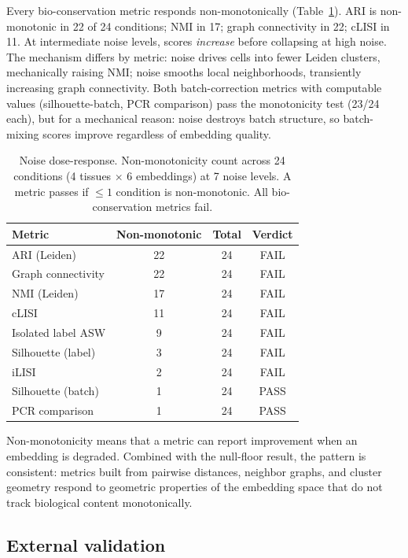 \documentclass[11pt]{article}
\begin{document}
Every bio-conservation metric responds non-monotonically
(Table~\ref{tab:noise}). ARI is non-monotonic in 22 of 24 conditions;
NMI in 17; graph connectivity in 22; cLISI in 11. At intermediate noise
levels, scores \emph{increase} before collapsing at high noise. The
mechanism differs by metric: noise drives cells into fewer Leiden
clusters, mechanically raising NMI; noise smooths local neighborhoods,
transiently increasing graph connectivity. Both batch-correction metrics
with computable values (silhouette-batch, PCR comparison) pass the
monotonicity test (23/24 each), but for a mechanical reason: noise
destroys batch structure, so batch-mixing scores improve regardless of
embedding quality.

\begin{table}[t]
\centering
\caption{Noise dose-response. Non-monotonicity count across 24
conditions (4 tissues $\times$ 6 embeddings) at 7 noise levels. A
metric passes if $\leq 1$ condition is non-monotonic. All
bio-conservation metrics fail.}
\label{tab:noise}
\small
\begin{tabular}{@{}lccc@{}}
\toprule
Metric & Non-monotonic & Total & Verdict \\
\midrule
ARI (Leiden)         & 22 & 24 & FAIL \\
Graph connectivity   & 22 & 24 & FAIL \\
NMI (Leiden)         & 17 & 24 & FAIL \\
cLISI                & 11 & 24 & FAIL \\
Isolated label ASW   &  9 & 24 & FAIL \\
Silhouette (label)   &  3 & 24 & FAIL \\
iLISI                &  2 & 24 & FAIL \\
\midrule
Silhouette (batch)   &  1 & 24 & PASS \\
PCR comparison       &  1 & 24 & PASS \\
\bottomrule
\end{tabular}
\end{table}

Non-monotonicity means that a metric can report improvement when an
embedding is degraded. Combined with the null-floor result, the pattern
is consistent: metrics built from pairwise distances, neighbor graphs,
and cluster geometry respond to geometric properties of the embedding
space that do not track biological content monotonically.


\subsection{External validation}
\label{sec:external}
\end{document}
